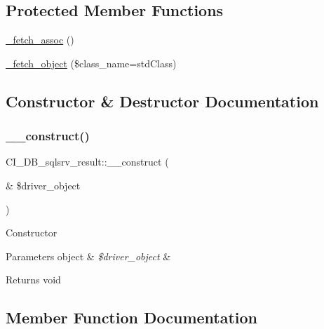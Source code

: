 \subsection*{Protected Member Functions}
\begin{DoxyCompactItemize}
\item 
\mbox{\hyperlink{class_c_i___d_b__sqlsrv__result_a39c44e9d00bd13a97af50911a496949c}{\+\_\+fetch\+\_\+assoc}} ()
\item 
\mbox{\hyperlink{class_c_i___d_b__sqlsrv__result_a73f23dd4d5462f6510bf4721c9e6c4a2}{\+\_\+fetch\+\_\+object}} (\$class\+\_\+name=\textquotesingle{}std\+Class\textquotesingle{})
\end{DoxyCompactItemize}


\subsection{Constructor \& Destructor Documentation}
\mbox{\label{class_c_i___d_b__sqlsrv__result_ad7243f8d3224a8c434770b47539817d5}} 
\subsubsection{\texorpdfstring{\+\_\+\+\_\+construct()}{\_\_construct()}}
{\footnotesize\ttfamily C\+I\+\_\+\+D\+B\+\_\+sqlsrv\+\_\+result\+::\+\_\+\+\_\+construct (\begin{DoxyParamCaption}\item[{\&}]{\$driver\+\_\+object }\end{DoxyParamCaption})}

Constructor


\begin{DoxyParams}[1]{Parameters}
object & {\em \$driver\+\_\+object} & \\
\hline
\end{DoxyParams}
\begin{DoxyReturn}{Returns}
void 
\end{DoxyReturn}


\subsection{Member Function Documentation}
\mbox{\label{class_c_i___d_b__sqlsrv__result_a39c44e9d00bd13a97af50911a496949c}} 
